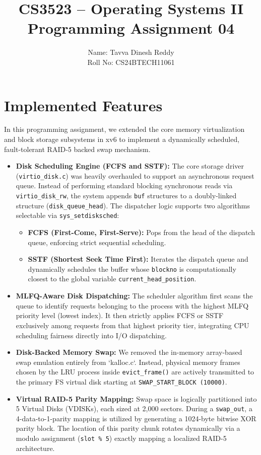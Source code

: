 \documentclass[11pt]{article}
\title{
    \textbf{CS3523 – Operating Systems II}\\
    Programming Assignment 04\\
}
\author{Name: Tavva Dinesh Reddy \\ Roll No: CS24BTECH11061}
\date{}
\begin{document}
\maketitle

\section{Implemented Features}
In this programming assignment, we extended the core memory virtualization and block storage subsystems in xv6 to implement a dynamically scheduled, fault-tolerant RAID-5 backed swap mechanism.
\begin{itemize}
    \item \textbf{Disk Scheduling Engine (FCFS and SSTF):} The core storage driver (\texttt{virtio\_disk.c}) was heavily overhauled to support an asynchronous request queue. Instead of performing standard blocking synchronous reads via \texttt{virtio\_disk\_rw}, the system appends \texttt{buf} structures to a doubly-linked structure (\texttt{disk\_queue\_head}). The dispatcher logic supports two algorithms selectable via \texttt{sys\_setdisksched}:
    \begin{itemize}
        \item \textbf{FCFS (First-Come, First-Serve):} Pops from the head of the dispatch queue, enforcing strict sequential scheduling.
        \item \textbf{SSTF (Shortest Seek Time First):} Iterates the dispatch queue and dynamically schedules the buffer whose \texttt{blockno} is computationally closest to the global variable \texttt{current\_head\_position}.
    \end{itemize}
    \item \textbf{MLFQ-Aware Disk Dispatching:} The scheduler algorithm first scans the queue to identify requests belonging to the process with the highest MLFQ priority level (lowest index). It then strictly applies FCFS or SSTF exclusively among requests from that highest priority tier, integrating CPU scheduling fairness directly into I/O dispatching.
    \item \textbf{Disk-Backed Memory Swap:} We removed the in-memory array-based swap emulation entirely from `kalloc.c`. Instead, physical memory frames chosen by the LRU process inside \texttt{evict\_frame()} are actively transmitted to the primary FS virtual disk starting at \texttt{SWAP\_START\_BLOCK (10000)}.
    \item \textbf{Virtual RAID-5 Parity Mapping:} Swap space is logically partitioned into 5 Virtual Disks (VDISKs), each sized at 2,000 sectors. During a \texttt{swap\_out}, a 4-data-to-1-parity mapping is utilized by generating a 1024-byte bitwise XOR parity block. The location of this parity chunk rotates dynamically via a modulo assignment (\texttt{slot \% 5}) exactly mapping a localized RAID-5 architecture.

\end{itemize}
\end{document}
